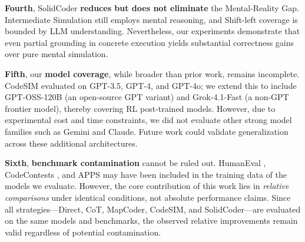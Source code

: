 \documentclass[11pt]{article}
\begin{document}
\textbf{Fourth}, SolidCoder \textbf{reduces but does not eliminate} the Mental-Reality Gap. Intermediate Simulation still employs mental reasoning, and Shift-left coverage is bounded by LLM understanding. Nevertheless, our experiments demonstrate that even partial grounding in concrete execution yields substantial correctness gains over pure mental simulation.

\textbf{Fifth}, our \textbf{model coverage}, while broader than prior work, remains incomplete. CodeSIM evaluated on GPT-3.5, GPT-4, and GPT-4o; we extend this to include GPT-OSS-120B (an open-source GPT variant) and Grok-4.1-Fast (a non-GPT frontier model), thereby covering RL post-trained models. However, due to experimental cost and time constraints, we did not evaluate other strong model families such as Gemini and Claude. Future work could validate generalization across these additional architectures.

\textbf{Sixth}, \textbf{benchmark contamination} cannot be ruled out. HumanEval \citep{chen2021evaluating}, CodeContests \citep{li2022competition}, and APPS \citep{hendrycks2021measuring} may have been included in the training data of the models we evaluate. However, the core contribution of this work lies in \textit{relative comparisons} under identical conditions, not absolute performance claims. Since all strategies---Direct, CoT, MapCoder, CodeSIM, and SolidCoder---are evaluated on the same models and benchmarks, the observed relative improvements remain valid regardless of potential contamination.
\end{document}
